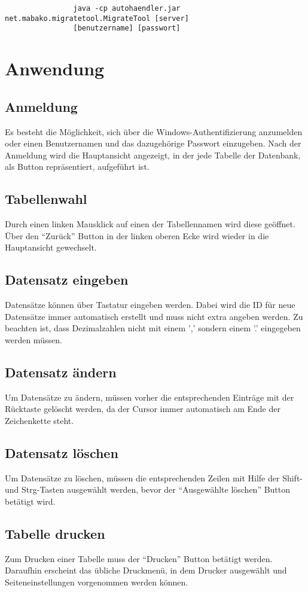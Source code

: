			\begin{verbatim}
				java -cp autohaendler.jar net.mabako.migratetool.MigrateTool [server]
				[benutzername] [passwort]
			\end{verbatim}
	
\chapter{Anwendung}
	\section{Anmeldung}
		Es besteht die Möglichkeit, sich über die Windows-Authentifizierung anzumelden
		oder einen Benutzernamen und das dazugehörige Passwort einzugeben.
		Nach der Anmeldung wird die Hauptansicht angezeigt, in der jede Tabelle der
		Datenbank, als Button repräsentiert, aufgeführt ist.
		
	\section{Tabellenwahl}
		Durch einen linken Mausklick auf einen der Tabellennamen wird diese geöffnet.
		Über den ``Zurück'' Button in der linken oberen Ecke wird wieder in die
		Hauptansicht gewechselt.
		
	\section{Datensatz eingeben}
		Datensätze können über Tastatur eingeben werden. Dabei wird die ID für
		neue Datensätze immer automatisch erstellt und muss nicht extra angeben
		werden.
		Zu beachten ist, dass Dezimalzahlen nicht mit einem ',' sondern einem '.'
		eingegeben werden müssen.
		
	\section{Datensatz ändern}
		Um Datensätze zu ändern, müssen vorher die entsprechenden Einträge mit der
		Rücktaste gelöscht werden, da der Cursor immer automatisch am Ende der
		Zeichenkette steht.
		
	\section{Datensatz löschen}
		Um Datensätze zu löschen, müssen die entsprechenden Zeilen mit Hilfe der
		Shift- und Strg-Tasten ausgewählt werden, bevor der ``Ausgewählte löschen''
		Button betätigt wird.
		
	\section{Tabelle drucken}
		Zum Drucken einer Tabelle muss der ``Drucken'' Button betätigt werden.
		Daraufhin erscheint das übliche Druckmenü, in dem Drucker ausgewählt und
		Seiteneinstellungen vorgenommen werden können.
	
